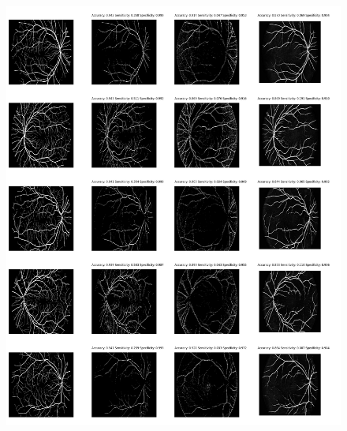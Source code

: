 \documentclass{article}
\begin{document}
\begin{enumerate}
\begin{center}
\begin{figure}[h]
\begin{minipage}{0.89\textwidth}
                      \includegraphics[width=0.89\linewidth]{../res/predicted-images.png}
                  \end{minipage}
              \end{figure}
          \end{center}
\end{enumerate}
\end{document}

